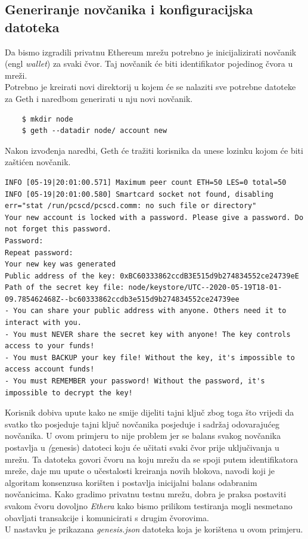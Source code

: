 \documentclass[times, utf8, zavrsni]{fer}
\begin{document}
\subsection{Generiranje novčanika i konfiguracijska datoteka}
Da bismo izgradili privatnu Ethereum mrežu potrebno je inicijalizirati novčanik (engl \emph{wallet}) za svaki čvor. Taj novčanik
će biti identifikator pojedinog čvora u mreži. \\
Potrebno je kreirati novi direktorij u kojem će se nalaziti sve potrebne datoteke za Geth i naredbom generirati u nju novi novčanik.

\begin{lstlisting}
    $ mkdir node
    $ geth --datadir node/ account new
\end{lstlisting}

Nakon izvođenja naredbi, Geth će tražiti korisnika da unese lozinku kojom će biti zaštićen novčanik.

\begin{lstlisting}
INFO [05-19|20:01:00.571] Maximum peer count ETH=50 LES=0 total=50
INFO [05-19|20:01:00.580] Smartcard socket not found, disabling err="stat /run/pcscd/pcscd.comm: no such file or directory"
Your new account is locked with a password. Please give a password. Do not forget this password.
Password: 
Repeat password: 
Your new key was generated
Public address of the key: 0xBC60333862ccdB3E515d9b274834552ce24739eE
Path of the secret key file: node/keystore/UTC--2020-05-19T18-01-09.785462468Z--bc60333862ccdb3e515d9b274834552ce24739ee
- You can share your public address with anyone. Others need it to interact with you.
- You must NEVER share the secret key with anyone! The key controls access to your funds!
- You must BACKUP your key file! Without the key, it's impossible to access account funds!
- You must REMEMBER your password! Without the password, it's impossible to decrypt the key!
\end{lstlisting}

Korisnik dobiva upute kako ne smije dijeliti tajni ključ zbog toga što vrijedi da svatko tko posjeduje tajni ključ novčanika
posjeduje i sadržaj odovarajućeg novčanika. U ovom primjeru to nije problem jer se balans svakog novčanika postavlja u \emph(genesis)
datoteci koju će učitati svaki čvor prije uključivanja u mrežu. Ta datoteka govori čvoru na koju mrežu da se spoji putem identifikatora
mreže, daje mu upute o učestalosti kreiranja novih blokova, navodi koji je algoritam konsenzusa korišten i postavlja inicijalni balans
odabranim novčanicima. Kako gradimo privatnu testnu mrežu, dobra je praksa postaviti svakom čvoru dovoljno \emph{Ethera} kako bismo
prilikom testiranja mogli nesmetano obavljati transakcije i komunicirati s drugim čvorovima. \\
U nastavku je prikazana \emph{genesis.json} datoteka koja je korištena u ovom primjeru.
\end{document}
